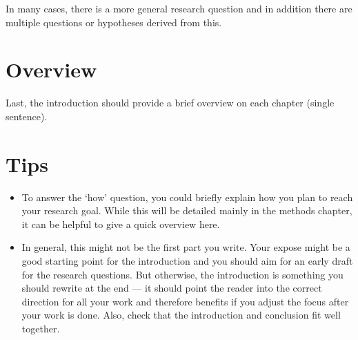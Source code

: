 In many cases, there is a more general research question and in addition there are multiple questions or hypotheses derived from this.

\section{Overview}
Last, the introduction should provide a brief overview on each chapter (single sentence).

\section*{Tips}
\begin{itemize}
    \item To answer the `how' question, you could briefly explain how you plan to reach your research goal. While this will be detailed mainly in the methods chapter, it can be helpful to give a quick overview here.
    \item In general, this might not be the first part you write. Your expose might be a good starting point for the introduction and you should aim for an early draft for the research questions. But otherwise, the introduction is something you should rewrite at the end --- it should point the reader into the correct direction for all your work and therefore benefits if you adjust the focus after your work is done. Also, check that the introduction and conclusion fit well together.
\end{itemize}
